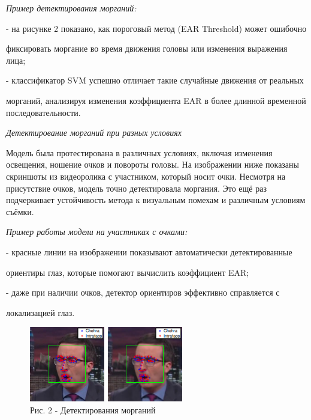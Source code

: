 \begin{multicols}{2}
\emph{Пример детектирования морганий:}

- на рисунке 2 показано, как пороговый метод (EAR Threshold) может
ошибочно

фиксировать моргание во время движения головы или изменения выражения
лица;

- классификатор SVM успешно отличает такие случайные движения от
реальных

морганий, анализируя изменения коэффициента EAR в более длинной
временной последовательности.

\emph{Детектирование морганий при разных условиях}

Модель была протестирована в различных условиях, включая изменения
освещения, ношение очков и повороты головы. На изображении ниже показаны
скриншоты из видеоролика с участником, который носит очки. Несмотря на
присутствие очков, модель точно детектировала моргания. Это ещё раз
подчеркивает устойчивость метода к визуальным помехам и различным
условиям съёмки.

\emph{Пример работы модели на участниках с очками:}

- красные линии на изображении показывают автоматически детектированные

ориентиры глаз, которые помогают вычислить коэффициент EAR;

- даже при наличии очков, детектор ориентиров эффективно справляется с

локализацией глаз.
\end{multicols}

\begin{figure}[H]
	\centering
	\includegraphics[width=0.6\textwidth]{media/ict/image16}
	\caption*{Рис. 2 - Детектирования морганий}
\end{figure}


